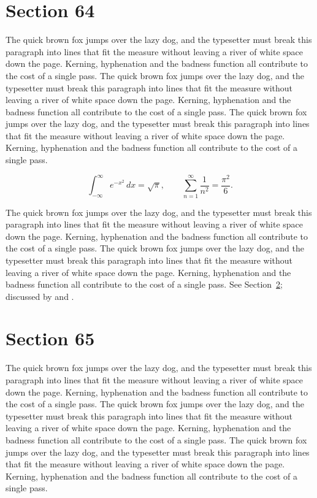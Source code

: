 \documentclass{article}
\begin{document}
\section{Section 64}
\label{sec:64}
The quick brown fox jumps over the lazy dog, and the typesetter must break this paragraph into lines that fit the measure without leaving a river of white space down the page. Kerning, hyphenation and the badness function all contribute to the cost of a single pass. The quick brown fox jumps over the lazy dog, and the typesetter must break this paragraph into lines that fit the measure without leaving a river of white space down the page. Kerning, hyphenation and the badness function all contribute to the cost of a single pass. The quick brown fox jumps over the lazy dog, and the typesetter must break this paragraph into lines that fit the measure without leaving a river of white space down the page. Kerning, hyphenation and the badness function all contribute to the cost of a single pass. 

\begin{equation}\label{eq:64}
\int_{-\infty}^{\infty} e^{-x^{2}}\,dx = \sqrt{\pi}, \qquad
\sum_{n=1}^{\infty} \frac{1}{n^{2}} = \frac{\pi^{2}}{6}.
\end{equation}

The quick brown fox jumps over the lazy dog, and the typesetter must break this paragraph into lines that fit the measure without leaving a river of white space down the page. Kerning, hyphenation and the badness function all contribute to the cost of a single pass. The quick brown fox jumps over the lazy dog, and the typesetter must break this paragraph into lines that fit the measure without leaving a river of white space down the page. Kerning, hyphenation and the badness function all contribute to the cost of a single pass. 
See Section~\ref{sec:65}; discussed by \textcite{k5} and \textcite{l2}.
\section{Section 65}
\label{sec:65}
The quick brown fox jumps over the lazy dog, and the typesetter must break this paragraph into lines that fit the measure without leaving a river of white space down the page. Kerning, hyphenation and the badness function all contribute to the cost of a single pass. The quick brown fox jumps over the lazy dog, and the typesetter must break this paragraph into lines that fit the measure without leaving a river of white space down the page. Kerning, hyphenation and the badness function all contribute to the cost of a single pass. The quick brown fox jumps over the lazy dog, and the typesetter must break this paragraph into lines that fit the measure without leaving a river of white space down the page. Kerning, hyphenation and the badness function all contribute to the cost of a single pass. 
\end{document}
